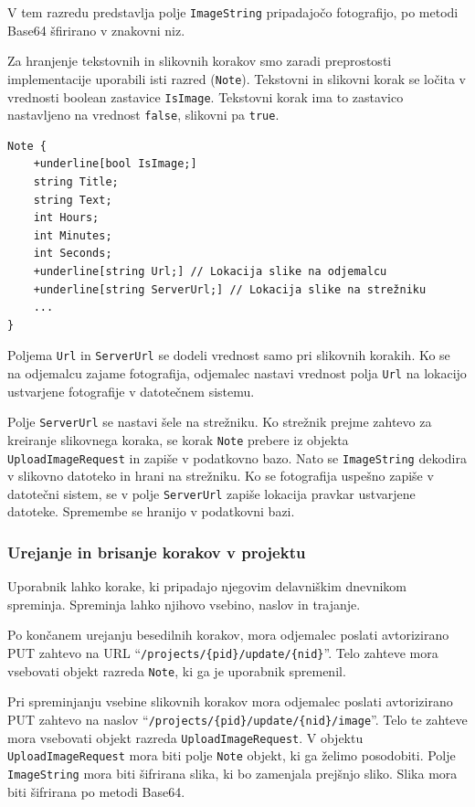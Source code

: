 \documentclass[a4paper, 12pt]{book}
\begin{document}
V tem razredu predstavlja polje \texttt{ImageString} pripadajočo fotografijo, po metodi Base64 šfirirano v znakovni niz.

Za hranjenje tekstovnih in slikovnih korakov smo zaradi preprostosti implementacije uporabili isti razred (\texttt{Note}).
Tekstovni in slikovni korak se ločita v vrednosti boolean zastavice \texttt{IsImage}.
Tekstovni korak ima to zastavico nastavljeno na vrednost \texttt{false}, slikovni pa \texttt{true}.

\begin{Verbatim}[commandchars=+\[\]]
Note { 
    +underline[bool IsImage;]
    string Title; 
    string Text; 
    int Hours; 
    int Minutes;
    int Seconds; 
    +underline[string Url;] // Lokacija slike na odjemalcu 
    +underline[string ServerUrl;] // Lokacija slike na strežniku
    ... 
}
\end{Verbatim}

Poljema \texttt{Url} in \texttt{ServerUrl} se dodeli vrednost samo pri slikovnih korakih.
Ko se na odjemalcu zajame fotografija, odjemalec nastavi vrednost polja \texttt{Url} na lokacijo ustvarjene fotografije v datotečnem sistemu.

Polje \texttt{ServerUrl} se nastavi šele na strežniku.
Ko strežnik prejme zahtevo za kreiranje slikovnega koraka, se korak \texttt{Note} prebere iz objekta \texttt{UploadImageRequest} in zapiše v podatkovno bazo.
Nato se \texttt{ImageString} dekodira v slikovno datoteko in hrani na strežniku.
Ko se fotografija uspešno zapiše v datotečni sistem, se v polje \texttt{ServerUrl} zapiše lokacija pravkar ustvarjene datoteke.
Spremembe se hranijo v podatkovni bazi.

\subsubsection{Urejanje in brisanje korakov v projektu}

Uporabnik lahko korake, ki pripadajo njegovim delavniškim dnevnikom spreminja.
Spreminja lahko njihovo vsebino, naslov in trajanje.

Po končanem urejanju besedilnih korakov, mora odjemalec poslati avtorizirano PUT zahtevo na URL \enquote{\texttt{/projects/\{pid\}/update/\{nid\}}}.
Telo zahteve mora vsebovati objekt razreda \texttt{Note}, ki ga je uporabnik spremenil.

Pri spreminjanju vsebine slikovnih korakov mora odjemalec poslati avtorizirano PUT zahtevo na naslov \enquote{\texttt{/projects/\{pid\}/update/\{nid\}/image}}.
Telo te zahteve mora vsebovati objekt razreda \texttt{UploadImageRequest}.
V objektu \texttt{UploadImageRequest} mora biti polje \texttt{Note} objekt, ki ga želimo posodobiti.
Polje \texttt{ImageString} mora biti šifrirana slika, ki bo zamenjala prejšnjo sliko.
Slika mora biti šifrirana po metodi Base64.
\end{document}
